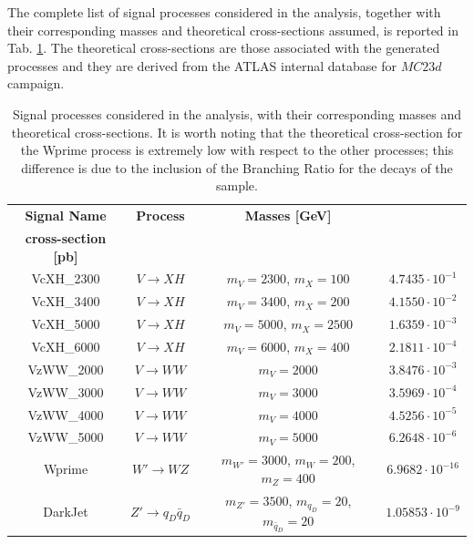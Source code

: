 \noindent The complete list of signal processes considered in the analysis, together with their corresponding masses and theoretical cross-sections assumed, is reported in Tab. \ref{tab:sec:ADJJ/dataset/Signal}.
The theoretical cross-sections are those associated with the generated processes and they are derived from the ATLAS internal database for $MC23d$ campaign.

\begin{table}[htbp]
\raggedleft
\begin{tabular}{|c|c||c||c|}
\hline
\rowcolor{lightgray}
\textbf{Signal Name} & \textbf{Process} & \textbf{Masses [GeV]} & \shortstack{\textbf{Theoretical}\\\textbf{cross-section [pb]}} \\
\hline\hline 

 VcXH\_2300 & $V \to XH$ & $m_V = 2300$, $m_X = 100$ & $4.7435 \cdot 10^{-1}$ \\
 VcXH\_3400 & $V \to XH$ & $m_V = 3400$, $m_X = 200$ & $4.1550 \cdot 10^{-2}$ \\
 VcXH\_5000 & $V \to XH$ & $m_V = 5000$, $m_X = 2500$ & $1.6359 \cdot 10^{-3}$ \\
 VcXH\_6000 & $V \to XH$ & $m_V = 6000$, $m_X = 400$ & $2.1811 \cdot 10^{-4}$ \\
\hline

 VzWW\_2000 & $V \to WW$ & $m_V = 2000$ & $3.8476 \cdot 10^{-3}$ \\
 VzWW\_3000 & $V \to WW$ & $m_V = 3000$ & $3.5969 \cdot 10^{-4}$ \\
 VzWW\_4000 & $V \to WW$ & $m_V = 4000$ & $4.5256 \cdot 10^{-5}$ \\
 VzWW\_5000 & $V \to WW$ & $m_V = 5000$ & $6.2648 \cdot 10^{-6}$ \\
\hline
 
 Wprime & $W' \to WZ$ & $m_{W'} = 3000$, $m_W = 200$, $m_Z = 400$ & $6.9682 \cdot 10^{-16}$ \\
\hline
 
 DarkJet & $Z' \to q_D \bar{q}_D$ & $m_{Z'} = 3500$, $m_{q_D} = 20$, $m_{\bar{q}_D} = 20$ & $1.05853 \cdot 10^{-9}$ \\
\hline
 
\end{tabular}
\caption{Signal processes considered in the analysis, with their corresponding masses and theoretical cross-sections. It is worth noting that the theoretical cross-section for the Wprime process is extremely low with respect to the other processes; this difference is due to the inclusion of the Branching Ratio for the decays of the sample.}
\label{tab:sec:ADJJ/dataset/Signal}
\end{table}

